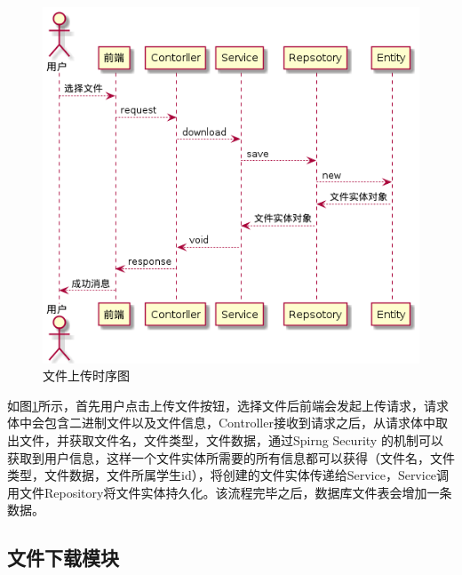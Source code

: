 \begin{figure}[ht]
    \centering
    \includegraphics[scale = 0.6]{out/uml/时序图/file-upload-sequence/file-upload-sequence.png}
    \caption{\song\wuhao 文件上传时序图}
    \label{file-upload-sequence}
\end{figure}

如图\ref{file-upload-sequence}所示，首先用户点击上传文件按钮，选择文件后前端会发起上传请求，请求体中会包含二进制文件以及文件信息，Controller接收到请求之后，从请求体中取出文件，并获取文件名，文件类型，文件数据，通过Spirng Security 的机制可以获取到用户信息，这样一个文件实体所需要的所有信息都可以获得（文件名，文件类型，文件数据，文件所属学生id），将创建的文件实体传递给Service，Service调用文件Repository将文件实体持久化。该流程完毕之后，数据库文件表会增加一条数据。

\subsection{文件下载模块}

